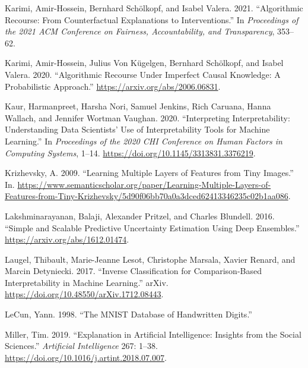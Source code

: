 \documentclass{juliacon}
\newlength{\cslhangindent}
\newlength{\cslentryspacingunit} %
\newenvironment{CSLReferences}[2] %
 {%
  \setlength{\parindent}{0pt}
  \ifodd #1
  \let\oldpar\par
  \def\par{\hangindent=\cslhangindent\oldpar}
  \fi
  \setlength{\parskip}{#2\cslentryspacingunit}
 }%
 {}
\begin{document}
\begin{CSLReferences}{1}{0}
\leavevmode{}%
Karimi, Amir-Hossein, Bernhard Schölkopf, and Isabel Valera. 2021.
{``Algorithmic Recourse: From Counterfactual Explanations to
Interventions.''} In \emph{Proceedings of the 2021 {ACM Conference} on
{Fairness}, {Accountability}, and {Transparency}}, 353--62.

\leavevmode{}%
Karimi, Amir-Hossein, Julius Von Kügelgen, Bernhard Schölkopf, and
Isabel Valera. 2020. {``Algorithmic Recourse Under Imperfect Causal
Knowledge: A Probabilistic Approach.''}
\url{https://arxiv.org/abs/2006.06831}.

\leavevmode{}%
Kaur, Harmanpreet, Harsha Nori, Samuel Jenkins, Rich Caruana, Hanna
Wallach, and Jennifer Wortman Vaughan. 2020. {``Interpreting
Interpretability: Understanding Data Scientists' Use of Interpretability
Tools for Machine Learning.''} In \emph{Proceedings of the 2020 {CHI}
Conference on Human Factors in Computing Systems}, 1--14.
\url{https://doi.org/10.1145/3313831.3376219}.

\leavevmode{}%
Krizhevsky, A. 2009. {``Learning {Multiple} {Layers} of {Features} from
{Tiny} {Images}.''} In.
\url{https://www.semanticscholar.org/paper/Learning-Multiple-Layers-of-Features-from-Tiny-Krizhevsky/5d90f06bb70a0a3dced62413346235c02b1aa086}.

\leavevmode{}%
Lakshminarayanan, Balaji, Alexander Pritzel, and Charles Blundell. 2016.
{``Simple and Scalable Predictive Uncertainty Estimation Using Deep
Ensembles.''} \url{https://arxiv.org/abs/1612.01474}.

\leavevmode{}%
Laugel, Thibault, Marie-Jeanne Lesot, Christophe Marsala, Xavier Renard,
and Marcin Detyniecki. 2017. {``Inverse {Classification} for
{Comparison}-Based {Interpretability} in {Machine} {Learning}.''} arXiv.
\url{https://doi.org/10.48550/arXiv.1712.08443}.

\leavevmode{}%
LeCun, Yann. 1998. {``The {MNIST} Database of Handwritten Digits.''}

\leavevmode{}%
Miller, Tim. 2019. {``Explanation in Artificial Intelligence: {Insights}
from the Social Sciences.''} \emph{Artificial Intelligence} 267: 1--38.
\url{https://doi.org/10.1016/j.artint.2018.07.007}.


\end{CSLReferences}
\end{document}
